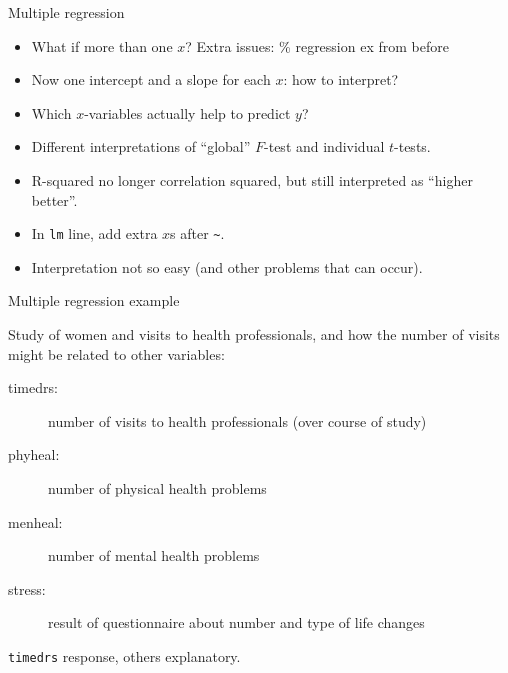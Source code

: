 \documentclass[ignorenonframetext,]{beamer}
\begin{document}
\begin{frame}[fragile]{Multiple regression}
\protect\hypertarget{multiple-regression}{}

\begin{itemize}
\item
  What if more than one \(x\)? Extra issues: \% regression ex from
  before
\item
  Now one intercept and a slope for each \(x\): how to interpret?
\item
  Which \(x\)-variables actually help to predict \(y\)?
\item
  Different interpretations of ``global'' \(F\)-test and individual
  \(t\)-tests.
\item
  R-squared no longer correlation squared, but still interpreted as
  ``higher better''.
\item
  In \texttt{lm} line, add extra \(x\)s after
  \texttt{\textasciitilde{}}.
\item
  Interpretation not so easy (and other problems that can occur).
\end{itemize}

\end{frame}

\begin{frame}[fragile]{Multiple regression example}
\protect\hypertarget{multiple-regression-example}{}

Study of women and visits to health professionals, and how the number of
visits might be related to other variables:

\begin{description}
\item[timedrs:] number of visits to health professionals (over course of study)
\item[phyheal:] number of physical health problems
\item[menheal:] number of mental health problems
\item[stress:] result of questionnaire about number and type of life changes
\end{description}

\texttt{timedrs} response, others explanatory.

\end{frame}
\end{document}

